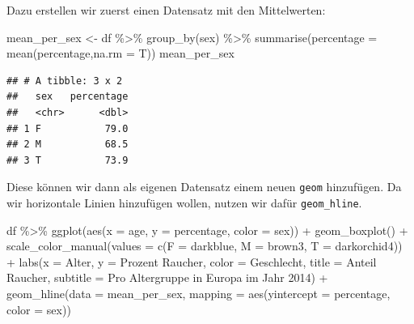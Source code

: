 \documentclass[
]{book}
\newenvironment{Shaded}{\begin{snugshade}}{\end{snugshade}}
\newcommand{\AttributeTok}[1]{\textcolor[rgb]{0.77,0.63,0.00}{#1}}
\newcommand{\FunctionTok}[1]{\textcolor[rgb]{0.00,0.00,0.00}{#1}}
\newcommand{\NormalTok}[1]{#1}
\newcommand{\OtherTok}[1]{\textcolor[rgb]{0.56,0.35,0.01}{#1}}
\newcommand{\SpecialCharTok}[1]{\textcolor[rgb]{0.00,0.00,0.00}{#1}}
\newcommand{\StringTok}[1]{\textcolor[rgb]{0.31,0.60,0.02}{#1}}
\begin{document}
Dazu erstellen wir zuerst einen Datensatz mit den Mittelwerten:

\begin{Shaded}
\begin{Highlighting}[]
\NormalTok{mean\_per\_sex }\OtherTok{\textless{}{-}}\NormalTok{ df }\SpecialCharTok{\%\textgreater{}\%} 
  \FunctionTok{group\_by}\NormalTok{(sex) }\SpecialCharTok{\%\textgreater{}\%} 
  \FunctionTok{summarise}\NormalTok{(}\AttributeTok{percentage =} \FunctionTok{mean}\NormalTok{(percentage,}\AttributeTok{na.rm =}\NormalTok{ T))}
\NormalTok{mean\_per\_sex}
\end{Highlighting}
\end{Shaded}

\begin{verbatim}
## # A tibble: 3 x 2
##   sex   percentage
##   <chr>      <dbl>
## 1 F           79.0
## 2 M           68.5
## 3 T           73.9
\end{verbatim}

Diese können wir dann als eigenen Datensatz einem neuen \texttt{geom} hinzufügen. Da wir horizontale Linien hinzufügen wollen, nutzen wir dafür \texttt{geom\_hline}.

\begin{Shaded}
\begin{Highlighting}[]
\NormalTok{df }\SpecialCharTok{\%\textgreater{}\%} 
  \FunctionTok{ggplot}\NormalTok{(}\FunctionTok{aes}\NormalTok{(}\AttributeTok{x =}\NormalTok{ age,}
             \AttributeTok{y =}\NormalTok{ percentage,}
             \AttributeTok{color =}\NormalTok{ sex)) }\SpecialCharTok{+}
  \FunctionTok{geom\_boxplot}\NormalTok{() }\SpecialCharTok{+}
  \FunctionTok{scale\_color\_manual}\NormalTok{(}\AttributeTok{values =} \FunctionTok{c}\NormalTok{(}\AttributeTok{F =} \StringTok{\textquotesingle{}darkblue\textquotesingle{}}\NormalTok{,}
                               \AttributeTok{M =} \StringTok{\textquotesingle{}brown3\textquotesingle{}}\NormalTok{,}
                               \AttributeTok{T =} \StringTok{\textquotesingle{}darkorchid4\textquotesingle{}}\NormalTok{)) }\SpecialCharTok{+}
  \FunctionTok{labs}\NormalTok{(}\AttributeTok{x =} \StringTok{\textquotesingle{}Alter\textquotesingle{}}\NormalTok{,}
       \AttributeTok{y =} \StringTok{\textquotesingle{}Prozent Raucher\textquotesingle{}}\NormalTok{,}
       \AttributeTok{color =} \StringTok{\textquotesingle{}Geschlecht\textquotesingle{}}\NormalTok{,}
       \AttributeTok{title =} \StringTok{\textquotesingle{}Anteil Raucher\textquotesingle{}}\NormalTok{,}
       \AttributeTok{subtitle =} \StringTok{\textquotesingle{}Pro Altergruppe in Europa im Jahr 2014\textquotesingle{}}\NormalTok{) }\SpecialCharTok{+}
  \FunctionTok{geom\_hline}\NormalTok{(}\AttributeTok{data =}\NormalTok{ mean\_per\_sex,}
             \AttributeTok{mapping =} \FunctionTok{aes}\NormalTok{(}\AttributeTok{yintercept =}\NormalTok{ percentage,}
                           \AttributeTok{color =}\NormalTok{ sex))}
\end{Highlighting}
\end{Shaded}
\end{document}
